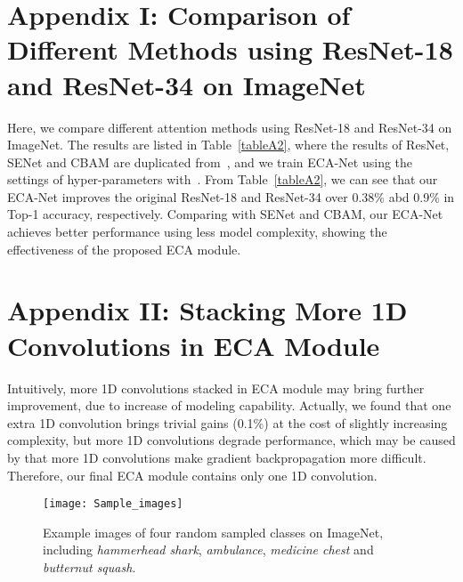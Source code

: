 \documentclass[10pt,twocolumn,letterpaper]{article}
\begin{document}
\section*{Appendix I: Comparison of Different Methods using ResNet-18 and ResNet-34 on ImageNet}

Here, we compare different attention methods using ResNet-18 and ResNet-34 on ImageNet. The results are listed in Table~\ref{tableA2}, where the results of ResNet, SENet and CBAM are duplicated from~\cite{Woo_2018_ECCV}, and we train ECA-Net using the settings of hyper-parameters with~\cite{Woo_2018_ECCV}. From Table~\ref{tableA2}, we can see that our ECA-Net improves the original ResNet-18 and ResNet-34 over 0.38\% abd 0.9\% in Top-1 accuracy, respectively. Comparing with SENet and CBAM, our ECA-Net achieves better performance using less model complexity, showing the effectiveness of the proposed ECA module.  

\section*{Appendix II: Stacking More 1D Convolutions in ECA Module}

Intuitively, more 1D convolutions stacked in ECA module may bring further improvement, due to increase of modeling capability. Actually, we found that one extra 1D convolution brings trivial  gains (0.1\%) at the cost of slightly increasing complexity, but more 1D convolutions degrade performance, which may be caused by that more 1D convolutions make gradient backpropagation more difficult. Therefore, our final ECA module contains only one 1D convolution.

\begin{figure}[t]
	\centering
	\texttt{[image: Sample\_images]}
	\caption{Example images of four random sampled classes on ImageNet, including \textit{hammerhead shark}, \textit{ambulance}, \textit{medicine chest} and \textit{butternut squash}.}
	\label{examples}
\end{figure}
\end{document}
